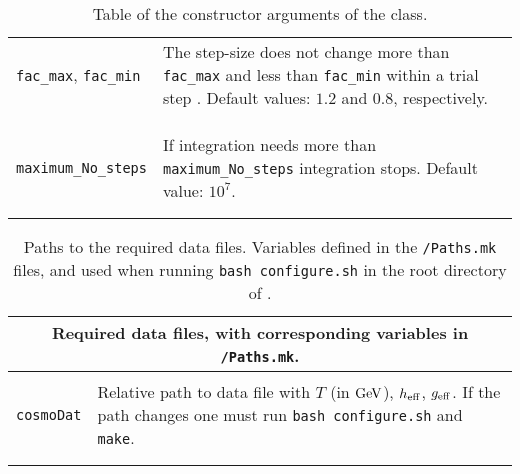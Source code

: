 \documentclass[11pt,a4paper]{article}
\begin{document}
\begin{table}[h!]
\begin{tabular}{l l}
		{\tt fac\_max}, {\tt fac\_min} &\multirow{1}{12cm}{The step-size does not change more than {\tt fac\_max} and less than {\tt fac\_min} within a trial step . Default values: $1.2$ and $0.8$, respectively.} \\ \\ \\ 
		\hline\\[-0.4cm]
		
		{\tt maximum\_No\_steps} & \multirow{1}{12cm}{If integration needs more than {\tt maximum\_No\_steps} integration stops. Default value: $10^7$.}\\\\
		\hline\\[-0.4cm]
	\end{tabular}
	\caption{Table of the constructor arguments of the  class.}
	\label{tab:NSC-input}
\end{table}

		
\begin{table}[h!]
	\centering
	\begin{tabular}{l l}
		\multicolumn{2}{c}{\bf Required data files, with corresponding variables in {\tt \nsc/Paths.mk}.}  \\
		\hline\\[-0.4cm]
	
		{\tt cosmoDat}& \multirow{1}{12cm}{Relative path to data file with $T$ (in ${\rm GeV}$), $h_{\rm eff}{}$, $g_{\rm eff}{}$. If the path changes one must run
		{\tt bash configure.sh} and {\tt make}.}\\\\		
		\hline\\[-0.4cm]

	\end{tabular}
	\caption{Paths to the required data files. Variables defined in the {\tt \nsc/Paths.mk} files, and used when running {\tt bash configure.sh} in the root directory of \nsc.}
\label{tab:input}
\end{table}
\end{document}
